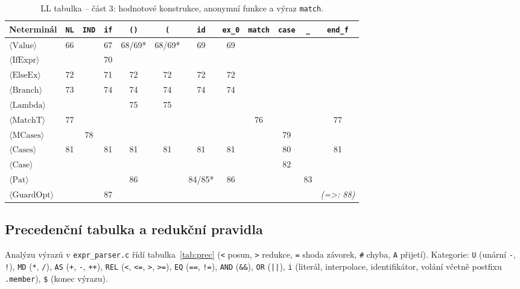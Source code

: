 \documentclass[11pt, a4paper]{article}
\renewcommand{\arraystretch}{1.15}%
\begin{document}
\begin{table}[H]
  \centering
  \footnotesize
  \renewcommand{\arraystretch}{1.22}
  \setlength{\tabcolsep}{4.5pt}
  \begin{tabular}{lccccccccccc}
    \toprule
    \textbf{Neterminál} & \texttt{NL} & \texttt{IND} & \texttt{if} & \texttt{()} & \texttt{(} & \texttt{id} & \texttt{ex\_0} & \texttt{match} & \texttt{case} & \texttt{\_} & \texttt{end\_f} \\
    \midrule
    $\langle\text{Value}\rangle$    & 66 & & 67 & 68/69* & 68/69* & 69 & 69 & & & & \\
    $\langle\text{IfExpr}\rangle$   & & & 70 & & & & & & & & \\
    $\langle\text{ElseEx}\rangle$   & 72 & & 71 & 72 & 72 & 72 & 72 & & & & \\
    $\langle\text{Branch}\rangle$   & 73 & & 74 & 74 & 74 & 74 & 74 & & & & \\
    $\langle\text{Lambda}\rangle$   & & & & 75 & 75 & & & & & & \\
    $\langle\text{MatchT}\rangle$   & 77 & & & & & & & 76 & & & 77 \\
    $\langle\text{MCases}\rangle$   & & 78 & & & & & & & 79 & & \\
    $\langle\text{Cases}\rangle$    & 81 & & 81 & 81 & 81 & 81 & 81 & & 80 & & 81 \\
    $\langle\text{Case}\rangle$     & & & & & & & & & 82 & & \\
    $\langle\text{Pat}\rangle$      & & & & 86 & & 84/85* & 86 & & & 83 & \\
    $\langle\text{GuardOpt}\rangle$ & & & 87 & & & & & & & & \textit{(=>: 88)} \\
    \bottomrule
  \end{tabular}
  \caption{LL tabulka -- část 3: hodnotové konstrukce, anonymní funkce a výraz \texttt{match}.}
  \label{tab:ll3}
\end{table}

\subsection{Precedenční tabulka a redukční pravidla}
Analýzu výrazů v \texttt{expr\_parser.c} řídí tabulka~\ref{tab:prec} (\texttt{<} posun, \texttt{>} redukce, \texttt{=} shoda závorek, \texttt{\#} chyba, \texttt{A} přijetí). Kategorie: \texttt{U} (unární \texttt{-}, \texttt{!}), \texttt{MD} (\texttt{*}, \texttt{/}), \texttt{AS} (\texttt{+}, \texttt{-}, \texttt{++}), \texttt{REL} (\texttt{<}, \texttt{<=}, \texttt{>}, \texttt{>=}), \texttt{EQ} (\texttt{==}, \texttt{!=}), \texttt{AND} (\texttt{\&\&}), \texttt{OR} (\texttt{||}), \texttt{i} (literál, interpolace, identifikátor, volání včetně postfixu \texttt{.member}), \texttt{\$} (konec výrazu).
\end{document}
